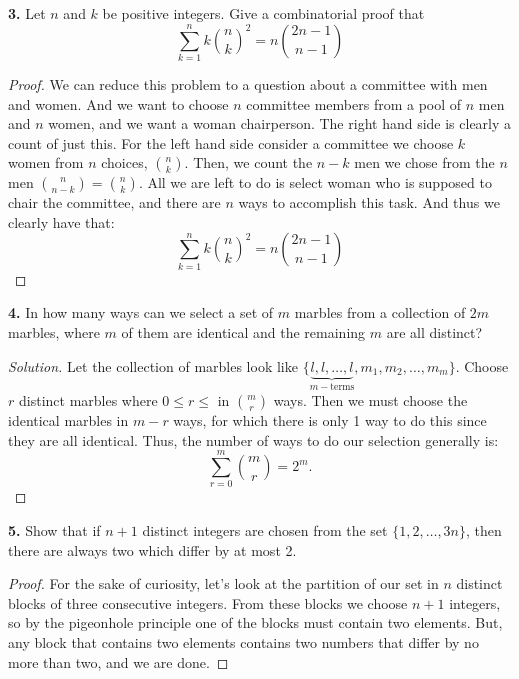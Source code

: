 \documentclass[12pt]{amsart}
\newenvironment{solution}
{\begin{proof}[Solution]}
{\end{proof}}
\begin{document}
\begin{onehalfspace}
        \noindent\textbf{3.} Let $n$ and $k$ be positive integers.
        Give a combinatorial proof that
        \begin{displaymath}
            \sum_{k=1}^n k\binom{n}{k}^2 = n\binom{2n-1}{n-1}
        \end{displaymath}
        \begin{proof}
            We can reduce this problem to a question about a committee with men and women.
            And we want to choose $n$ committee members from a pool of $n$ men and $n$ women, and we want
            a woman chairperson.
            The right hand side is clearly a count of just this.
            For the left hand side consider a committee we choose $k$ women from $n$ choices, $\binom{n}{k}$.
            Then, we count the $n-k$ men we chose from the $n$ men $\binom{n}{n-k} = \binom{n}{k}$.
            All we are left to do is select woman who is supposed to chair the committee, and there are
            $n$ ways to accomplish this task.
            And thus we clearly have that:
            \begin{displaymath}
                \sum_{k=1}^n k\binom{n}{k}^2 = n\binom{2n-1}{n-1}
            \end{displaymath}
        \end{proof}

        \noindent\textbf{4.} In how many ways can we select a set of $m$ marbles from a collection of $2m$ marbles,
        where $m$ of them are identical and the remaining $m$ are all distinct?
        \begin{solution}
            Let the collection of marbles look like $\{\underbrace{l,l,\ldots,l}_{m-\text{terms}},m_1,m_2,\ldots,m_m\}$.
            Choose $r$ distinct marbles where $0\le r\le$ in $\binom{m}{r}$ ways.
            Then we must choose the identical marbles in $m-r$ ways, for which there is only 1 way to
            do this since they are all identical.
            Thus, the number of ways to do our selection generally is:
            \begin{displaymath}
                \sum_{r=0}^m\binom{m}{r} = 2^m.
            \end{displaymath}
        \end{solution}

        \noindent\textbf{5.} Show that if $n+1$ distinct integers are chosen from the set $\{1,2,\ldots,3n\}$, then
        there are always two which differ by at most 2.
        \begin{proof}
            For the sake of curiosity, let's look at the partition of our set in $n$ distinct blocks of
            three consecutive integers.
            From these blocks we choose $n+1$ integers, so by the pigeonhole principle one of the blocks must contain
            two elements.
            But, any block that contains two elements contains two numbers that differ by no more than two,
            and we are done.
        \end{proof}


\end{onehalfspace}
\end{document}
